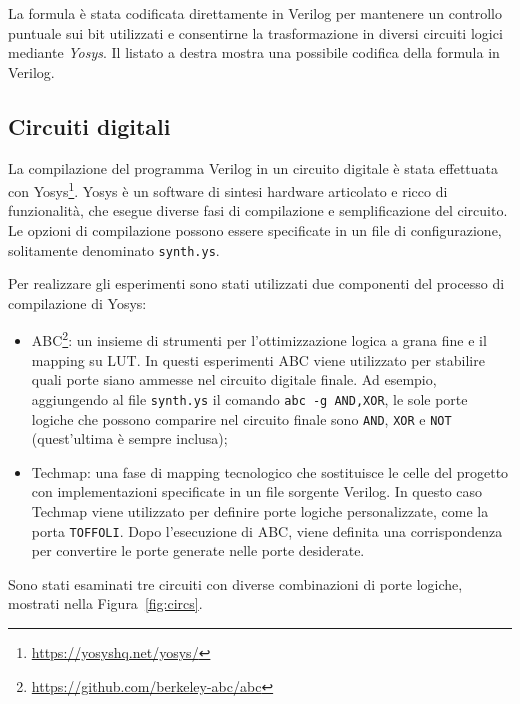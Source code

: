 \documentclass[]{article}
\begin{document}
La formula è stata codificata direttamente in Verilog per mantenere un controllo puntuale sui bit utilizzati e consentirne la trasformazione in diversi circuiti logici mediante \emph{Yosys}. Il listato a destra mostra una possibile codifica della formula in Verilog.
\subsection{Circuiti digitali}
La compilazione del programma Verilog in un circuito digitale è stata effettuata con Yosys\footnote{\url{https://yosyshq.net/yosys/}}. Yosys è un software di sintesi hardware articolato e ricco di funzionalità, che esegue diverse fasi di compilazione e semplificazione del circuito. Le opzioni di compilazione possono essere specificate in un file di configurazione, solitamente denominato \texttt{synth.ys}.

Per realizzare gli esperimenti sono stati utilizzati due componenti del processo di compilazione di Yosys:
\begin{itemize}
	\item ABC\footnote{\url{https://github.com/berkeley-abc/abc}}: un insieme di strumenti per l'ottimizzazione logica a grana fine e il mapping su LUT. In questi esperimenti ABC viene utilizzato per stabilire quali porte siano ammesse nel circuito digitale finale. Ad esempio, aggiungendo al file \texttt{synth.ys} il comando \texttt{abc -g AND,XOR}, le sole porte logiche che possono comparire nel circuito finale sono \texttt{AND}, \texttt{XOR} e \texttt{NOT} (quest'ultima è sempre inclusa);
	\item Techmap: una fase di mapping tecnologico che sostituisce le celle del progetto con implementazioni specificate in un file sorgente Verilog. In questo caso Techmap viene utilizzato per definire porte logiche personalizzate, come la porta \texttt{TOFFOLI}. Dopo l'esecuzione di ABC, viene definita una corrispondenza per convertire le porte generate nelle porte desiderate.
\end{itemize}

Sono stati esaminati tre circuiti con diverse combinazioni di porte logiche, mostrati nella Figura~\ref{fig:circs}.
\end{document}
